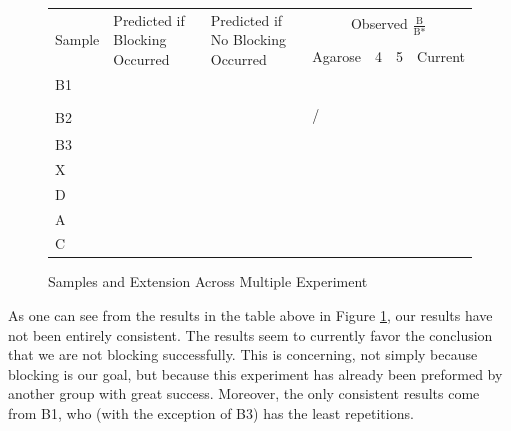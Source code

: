 \documentclass{ssiBio}
\begin{document}
\begin{figure}[ht]
\centering
\label{tab:sampleExtensionAll}
\begin{tabular}{lllllll}
	\multirow{2}{*}{Sample} & \multirow{2}{*}{Predicted if Blocking Occurred} & \multirow{2}{*}{Predicted if No Blocking Occurred} & \multicolumn{4}{c}{Observed $\frac{\textrm{B}}{\textrm{B*}}$}\\
                        &                                                 &                                                    & Agarose  & 4  & 5  & Current \\\hline
B1                      & \B                                              & \N                                                 &          &    & \N & \N      \\
                        &                                                 &                                                    &          &    & \N & \N      \\\hline
\multirow{2}{*}{B2}     & \multirow{2}{*}{\B}                             & \multirow{2}{*}{\Y}                                & \B / \N  & \Y & \Y & \Y      \\
                        &                                                 &                                                    &          &    & \N & \Y      \\\hline
\multirow{2}{*}{B3}     & \multirow{2}{*}{\Y}                             & \multirow{2}{*}{\Y}                                &          &    &    & \Y      \\
                        &                                                 &                                                    &          &    &    & \Y      \\\hline
X                       & \N                                              & \N                                                 & \N       & \N & \N & \N      \\\hline
D                       & \B                                              & \B                                                 &          & \B & \B & \B      \\\hline
A                       & \Y                                              & \Y                                                 & \Y       & \Y & \Y & \Y      \\\hline
C                       & \Y                                              & \Y                                                 & \Y       & \Y & \Y & \Y    
\end{tabular}
	\caption{Samples and Extension Across Multiple Experiment}
\end{figure}
As one can see from the results in the table above in Figure \ref{tab:sampleExtensionAll}, our results have not been entirely consistent. The results seem to currently favor the conclusion that we are not blocking successfully. This is concerning, not simply because blocking is our goal, but because this experiment has already been preformed by another group with great success. Moreover, the only consistent results come from B1, who (with the exception of B3) has the least repetitions. 
\end{document}
